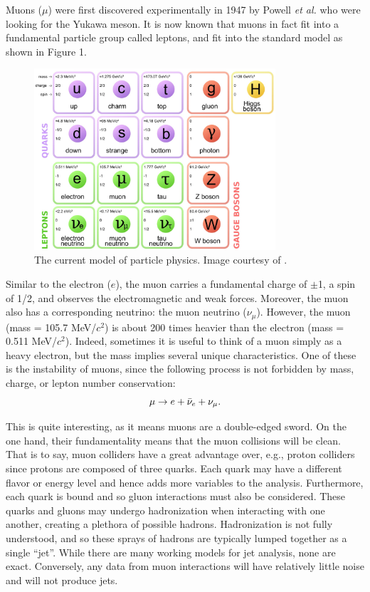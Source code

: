  \par
Muons ($\mu$) were first discovered experimentally in 1947 by Powell \emph{et al.} \cite{griffithspp} who were looking for the Yukawa meson.
It is now known that muons in fact fit into a fundamental particle group called leptons, and fit into the standard model as shown in Figure 1.

\begin{figure}[h!]
\label{fig:standardmodel}
\centering
\includegraphics[width=0.8\textwidth]{Figures/standardmodel.jpg} 
 \caption{The current model of particle physics. Image courtesy of \cite{quantumdiaries}.}
\end{figure}

Similar to the electron ($e$), the muon carries a fundamental charge of $\pm$1, a spin of 1/2, and observes the electromagnetic and weak forces. Moreover, the muon also has a corresponding neutrino: the muon neutrino ($\nu_\mu$). However, the muon (mass = 105.7 MeV/$c^2$) is about 200 times heavier than the electron (mass = 0.511 MeV/$c^2$). Indeed, sometimes it is useful to think of a muon simply as a heavy electron, but the mass implies several unique characteristics. One of these is the instability of muons, since the following process is not forbidden by mass, charge, or lepton number conservation:
\begin{equation} \nonumber
\mu \rightarrow e+\bar{\nu}_e+\nu_\mu.\\
\end{equation}

This is quite interesting, as it means muons are a double-edged sword. On the one hand, their fundamentality means that the muon collisions will be clean. That is to say, muon colliders have a great advantage over, e.g., proton colliders since protons are composed of three quarks. Each quark may have a different flavor or energy level and hence adds more variables to the analysis. Furthermore, each quark is bound and so gluon interactions must also be considered. These quarks and gluons may undergo hadronization when interacting with one another, creating a plethora of possible hadrons. Hadronization is not fully understood, and so these sprays of hadrons are typically lumped together as a single ``jet''. While there are many working models for jet analysis, none are exact. Conversely, any data from muon interactions will have relatively little noise and will not produce jets.

